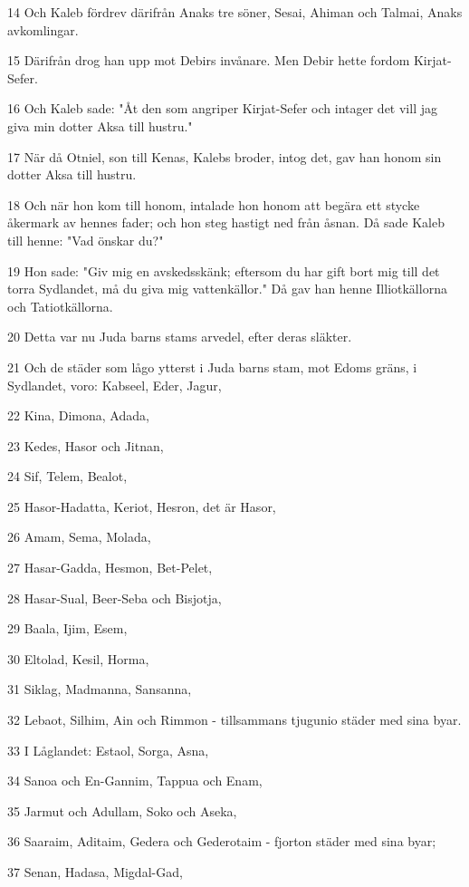 \par 14 Och Kaleb fördrev därifrån Anaks tre söner, Sesai, Ahiman och Talmai, Anaks avkomlingar.
\par 15 Därifrån drog han upp mot Debirs invånare. Men Debir hette fordom Kirjat-Sefer.
\par 16 Och Kaleb sade: "Åt den som angriper Kirjat-Sefer och intager det vill jag giva min dotter Aksa till hustru."
\par 17 När då Otniel, son till Kenas, Kalebs broder, intog det, gav han honom sin dotter Aksa till hustru.
\par 18 Och när hon kom till honom, intalade hon honom att begära ett stycke åkermark av hennes fader; och hon steg hastigt ned från åsnan. Då sade Kaleb till henne: "Vad önskar du?"
\par 19 Hon sade: "Giv mig en avskedsskänk; eftersom du har gift bort mig till det torra Sydlandet, må du giva mig vattenkällor." Då gav han henne Illiotkällorna och Tatiotkällorna.
\par 20 Detta var nu Juda barns stams arvedel, efter deras släkter.
\par 21 Och de städer som lågo ytterst i Juda barns stam, mot Edoms gräns, i Sydlandet, voro: Kabseel, Eder, Jagur,
\par 22 Kina, Dimona, Adada,
\par 23 Kedes, Hasor och Jitnan,
\par 24 Sif, Telem, Bealot,
\par 25 Hasor-Hadatta, Keriot, Hesron, det är Hasor,
\par 26 Amam, Sema, Molada,
\par 27 Hasar-Gadda, Hesmon, Bet-Pelet,
\par 28 Hasar-Sual, Beer-Seba och Bisjotja,
\par 29 Baala, Ijim, Esem,
\par 30 Eltolad, Kesil, Horma,
\par 31 Siklag, Madmanna, Sansanna,
\par 32 Lebaot, Silhim, Ain och Rimmon - tillsammans tjugunio städer med sina byar.
\par 33 I Låglandet: Estaol, Sorga, Asna,
\par 34 Sanoa och En-Gannim, Tappua och Enam,
\par 35 Jarmut och Adullam, Soko och Aseka,
\par 36 Saaraim, Aditaim, Gedera och Gederotaim - fjorton städer med sina byar;
\par 37 Senan, Hadasa, Migdal-Gad,
